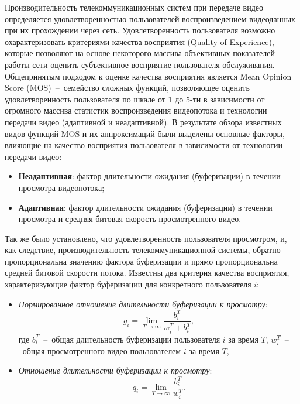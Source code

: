 Производительность телекоммуникационных систем при передаче видео определяется удовлетворенностью пользователей воспроизведением видеоданных при их прохождении через сеть. Удовлетворенность пользователя возможно охарактеризовать критериями качества восприятия (Quality of Experience), которые позволяют на основе некоторого массива объективных показателей работы сети оценить субъективное восприятие пользователя обслуживания. Общепринятым подходом к оценке качества восприятия является Mean Opinion Score (MOS)~--~семейство сложных функций, позволяющее оценить удовлетворенность пользователя по шкале от 1 до 5-ти в зависимости от огромного массива статистик воспроизведения видеопотока и технологии передачи видео (адаптивной и неадаптивной). В результате обзора известных видов функций MOS и их аппроксимаций были выделены основные факторы, влияющие на качество восприятия пользователя в зависимости от технологии передачи видео:
\begin{itemize}
	\item \textbf{Неадаптивная}: фактор длительности ожидания (буферизации) в течении просмотра видеопотока;
	\item \textbf{Адаптивная}: фактор длительности ожидания (буферизации) в течении просмотра и средняя битовая скорость просмотренного видео.
\end{itemize}
Так же было установлено, что удовлетворенность пользователя просмотром, и, как следствие, производительность телекоммуникационной системы, обратно пропорциональна значению фактора буферизации и прямо пропорциональна средней битовой скорости потока. Известны два критерия качества восприятия, характеризующие фактор буферизации для конкретного пользователя $i$:
\begin{itemize}
	\item \textit{Нормированное отношение длительности буферизации к просмотру}:
	\begin{equation}
    	\label{eq:g_def}
    	g_i = \lim\limits_{T\rightarrow\infty} \frac{b_i^T}{w_i^T + b_i^T},
    \end{equation}
    где $b_i^T$~--~общая длительность буферизации пользователя $i$ за время $T$, $w_i^T$~--~общая просмотренного видео пользователем $i$ за время $T$, 
	\item \textit{Отношение длительности буферизации к просмотру}: 
	\begin{equation}
    	\label{eq:q_def}
    	q_i = \lim\limits_{T\rightarrow\infty} \frac{b_i^T}{w_i^T}.
    \end{equation}
\end{itemize}

